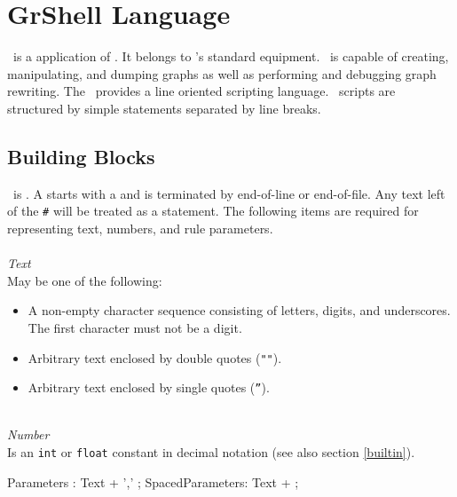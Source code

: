 \chapter{GrShell Language}
\label{chapgrshell}

\GrShell\ is a  application of \LibGr{}. 
It belongs to \GrG's standard equipment. \GrShell\ is capable of creating, manipulating, and dumping graphs as well as performing and debugging graph rewriting.
The \GrShell\ provides a line oriented scripting language. 
\GrShell\ scripts are structured by simple statements separated by line breaks.

\section{Building Blocks}

\GrShell\ is . 
A  starts with a \indexed{\texttt{\#}} and is terminated by end-of-line or end-of-file. 
Any text left of the \texttt{\#} will be treated as a statement.
The following items are required for representing text, numbers, and rule parameters.\\
\\
\emph{Text}\\
May be one of the following:
\begin{itemize}
  \item A non-empty character sequence consisting of letters, digits, and underscores. The first character must not be a digit.
  \item Arbitrary text enclosed by double quotes (\texttt{""}).
  \item Arbitrary text enclosed by single quotes (\texttt{''}).
\end{itemize}
\mbox{ }\\
\emph{Number}\\
Is an \texttt{int} or \texttt{float} constant in decimal notation (see also section \ref{builtin}).

\begin{rail} 
 Parameters : Text + ',' ;
 SpacedParameters: Text + ; 
\end{rail}

